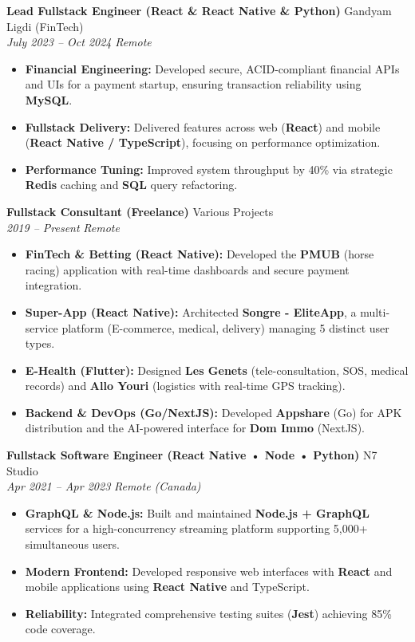 \documentclass[a4paper,10pt]{article}
\newcommand{\jobheader}[4]{%
    \textbf{#1} \hfill #2 \\
    \textit{#3} \hfill \textit{#4}
    \vspace{0.05cm}
}
\begin{document}
\vspace{0.15cm}

\jobheader{Lead Fullstack Engineer (React \& React Native \& Python)}{Gandyam Ligdi (FinTech)}{July 2023 -- Oct 2024}{Remote}
\begin{itemize}[leftmargin=*,nosep]
    \item \textbf{Financial Engineering:} Developed secure, ACID-compliant financial APIs and UIs for a payment startup, ensuring transaction reliability using \textbf{MySQL}.
    \item \textbf{Fullstack Delivery:} Delivered features across web (\textbf{React}) and mobile (\textbf{React Native / TypeScript}), focusing on performance optimization.
    \item \textbf{Performance Tuning:} Improved system throughput by 40\% via strategic \textbf{Redis} caching and \textbf{SQL} query refactoring.
\end{itemize}

\vspace{0.15cm}

\jobheader{Fullstack Consultant (Freelance)}{Various Projects}{2019 -- Present}{Remote}
\begin{itemize}[leftmargin=*,nosep]
    \item \textbf{FinTech \& Betting (React Native):} Developed the \textbf{PMUB} (horse racing) application with real-time dashboards and secure payment integration.
    \item \textbf{Super-App (React Native):} Architected \textbf{Songre - EliteApp}, a multi-service platform (E-commerce, medical, delivery) managing 5 distinct user types.
    \item \textbf{E-Health (Flutter):} Designed \textbf{Les Genets} (tele-consultation, SOS, medical records) and \textbf{Allo Youri} (logistics with real-time GPS tracking).
    \item \textbf{Backend \& DevOps (Go/NextJS):} Developed \textbf{Appshare} (Go) for APK distribution and the AI-powered interface for \textbf{Dom Immo} (NextJS).
\end{itemize}

\vspace{0.15cm}

\jobheader{Fullstack Software Engineer (React Native • Node • Python)}{N7 Studio}{Apr 2021 -- Apr 2023}{Remote (Canada)}
\begin{itemize}[leftmargin=*,nosep]
    \item \textbf{GraphQL \& Node.js:} Built and maintained \textbf{Node.js + GraphQL} services for a high-concurrency streaming platform supporting 5,000+ simultaneous users.
    \item \textbf{Modern Frontend:} Developed responsive web interfaces with \textbf{React} and mobile applications using \textbf{React Native} and TypeScript.
    \item \textbf{Reliability:} Integrated comprehensive testing suites (\textbf{Jest}) achieving 85\% code coverage.
\end{itemize}
\end{document}
